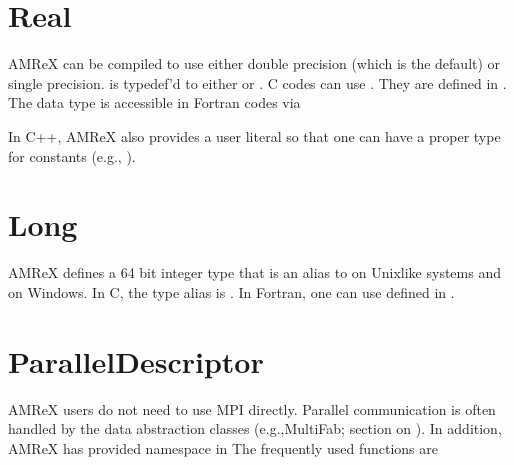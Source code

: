 \documentclass[letterpaper,10pt,english]{sphinxmanual}
\begin{document}
\section{Real}
\label{\detokenize{Basics:real}}
\sphinxAtStartPar
AMReX can be compiled to use either double precision (which is the default) or
single precision.  is typedef’d to either  or
. C codes can use . They are defined in
. The data type is accessible in Fortran codes via

\begin{sphinxVerbatim}[commandchars=\\\{\}]
   
\end{sphinxVerbatim}

\sphinxAtStartPar
In C++, AMReX also provides a user literal  so that one can
have a proper type for constants (e.g., ).


\section{Long}
\label{\detokenize{Basics:long}}
\sphinxAtStartPar
AMReX defines a 64 bit integer type  that is an alias to
 on Unix\sphinxhyphen{}like systems and  on Windows.  In
C, the type alias is .  In Fortran, one can use
 defined in .


\section{ParallelDescriptor}
\label{\detokenize{Basics:paralleldescriptor}}\label{\detokenize{Basics:sec-basics-paralleldescriptor}}
\sphinxAtStartPar
AMReX users do not need to use MPI directly. Parallel communication is often
handled by the data abstraction classes (e.g.,MultiFab; section on
{\hyperref[\detokenize{Basics:sec-basics-multifab}]{}}). In addition, AMReX has provided namespace
 in  The frequently
used functions are
\end{document}
